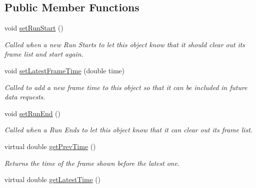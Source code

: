 \subsection*{Public Member Functions}
\begin{DoxyCompactItemize}
\item 
\hypertarget{class_picto_1_1_live_frame_reader_a098564555216fb091a89dfdbf5b712d6}{void \hyperlink{class_picto_1_1_live_frame_reader_a098564555216fb091a89dfdbf5b712d6}{set\-Run\-Start} ()}\label{class_picto_1_1_live_frame_reader_a098564555216fb091a89dfdbf5b712d6}

\begin{DoxyCompactList}\small\item\em Called when a new Run Starts to let this object know that it should clear out its frame list and start again. \end{DoxyCompactList}\item 
\hypertarget{class_picto_1_1_live_frame_reader_a34023f034855656dd54c34c331ca4e13}{void \hyperlink{class_picto_1_1_live_frame_reader_a34023f034855656dd54c34c331ca4e13}{set\-Latest\-Frame\-Time} (double time)}\label{class_picto_1_1_live_frame_reader_a34023f034855656dd54c34c331ca4e13}

\begin{DoxyCompactList}\small\item\em Called to add a new frame time to this object so that it can be included in future data requests. \end{DoxyCompactList}\item 
\hypertarget{class_picto_1_1_live_frame_reader_a558386d91faac9d1dcbd8e7525cce0b9}{void \hyperlink{class_picto_1_1_live_frame_reader_a558386d91faac9d1dcbd8e7525cce0b9}{set\-Run\-End} ()}\label{class_picto_1_1_live_frame_reader_a558386d91faac9d1dcbd8e7525cce0b9}

\begin{DoxyCompactList}\small\item\em Called when a Run Ends to let this object know that it can clear out its frame list. \end{DoxyCompactList}\item 
\hypertarget{class_picto_1_1_live_frame_reader_a7c8b08783d60e63e7de4ecec5719aaed}{virtual double \hyperlink{class_picto_1_1_live_frame_reader_a7c8b08783d60e63e7de4ecec5719aaed}{get\-Prev\-Time} ()}\label{class_picto_1_1_live_frame_reader_a7c8b08783d60e63e7de4ecec5719aaed}

\begin{DoxyCompactList}\small\item\em Returns the time of the frame shown before the latest one. \end{DoxyCompactList}\item 
\hypertarget{class_picto_1_1_live_frame_reader_a283db103fb614fef68523f8038f8c082}{virtual double \hyperlink{class_picto_1_1_live_frame_reader_a283db103fb614fef68523f8038f8c082}{get\-Latest\-Time} ()}\label{class_picto_1_1_live_frame_reader_a283db103fb614fef68523f8038f8c082}


\end{DoxyCompactItemize}
